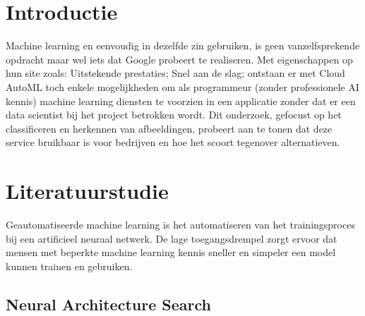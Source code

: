 
\section{Introductie} %
\label{sec:introductie}

Machine learning en eenvoudig in dezelfde zin gebruiken, is geen vanzelfsprekende opdracht maar wel iets dat Google probeert te realiseren. Met eigenschappen op hun site \autocite{Google2019} zoals: Uitstekende prestaties; Snel aan de slag; ontstaan er met Cloud AutoML toch enkele mogelijkheden om als programmeur (zonder professionele AI kennis) machine learning diensten te voorzien in een applicatie zonder dat er een data scientist bij het project betrokken wordt. Dit onderzoek, gefocust op het classificeren en herkennen van afbeeldingen, probeert aan te tonen dat deze service bruikbaar is voor bedrijven en hoe het scoort tegenover alternatieven.


\section{Literatuurstudie}
\label{sec:literatuurstudie}


Geautomatiseerde machine learning is het automatiseren van het trainingsproces bij een artificieel neuraal netwerk. De lage toegangsdrempel zorgt ervoor dat mensen met beperkte machine learning kennis sneller en simpeler een model kunnen trainen en gebruiken.

\subsection{Neural Architecture Search}

